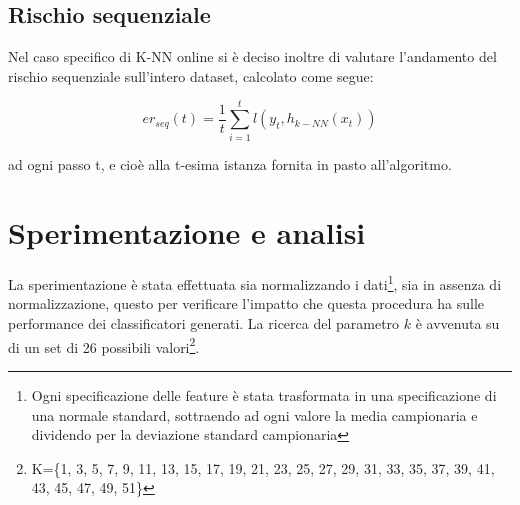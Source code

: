 \documentclass[fleqn,10pt]{SelfArx} %
\begin{document}
\subsection{Rischio sequenziale}
Nel caso specifico di K-NN online si è deciso inoltre di valutare l'andamento del rischio sequenziale sull'intero dataset, calcolato come segue:

\[
er_{seq}(t)=\frac{1}{t}\sum_{i=1}^{t} l(y_t,h_{k-NN}(x_t))
\]

ad ogni passo t, e cioè alla t-esima istanza fornita in pasto all'algoritmo.
\section{Sperimentazione e analisi}
La sperimentazione è stata effettuata sia normalizzando i dati\footnote{\footnotesize{Ogni specificazione delle feature è stata trasformata in una specificazione di una normale standard, sottraendo ad ogni valore la media campionaria e dividendo per la deviazione standard campionaria}}, sia in assenza di normalizzazione, questo per verificare l'impatto che questa procedura ha sulle performance dei classificatori generati.
\newline
\newline
La ricerca del parametro $k$ è avvenuta su di un set di 26 possibili valori\footnote{\footnotesize{K=\{1, 3, 5, 7, 9, 11, 13, 15, 17, 19, 21, 23, 25, 27, 29, 31, 33, 35, 37, 39, 41, 43, 45, 47, 49, 51\}}}.
\end{document}
